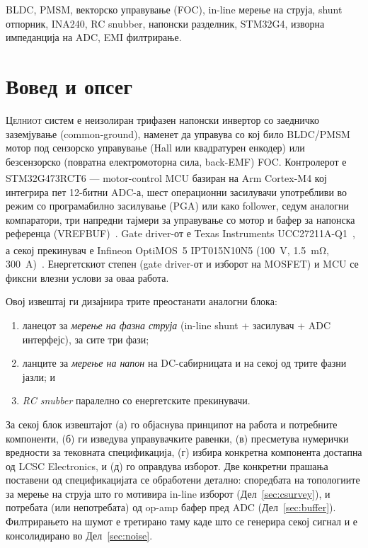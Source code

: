 \documentclass[journal,onecolumn,11pt]{IEEEtran}
\renewcommand{\IEEEPARstart}[2]{\lettrine[lines=2,findent=2pt,nindent=0pt]{#1}{#2}}
\begin{document}
\begin{IEEEkeywords}
BLDC, PMSM, векторско управување (FOC), in-line мерење на струја, shunt отпорник, INA240,
RC snubber, напонски разделник, STM32G4, изворна импеданција на ADC, EMI филтрирање.
\end{IEEEkeywords}

\section{Вовед и опсег}
\IEEEPARstart{Ц}{елниот} систем е неизолиран трифазен напонски инвертор со заедничко
заземјување (common-ground), наменет да управува со кој било BLDC/PMSM мотор под сензорско
управување (Hall или квадратурен енкодер) или безсензорско (повратна електромоторна сила,
back-EMF) FOC. Контролерот е STM32G473RCT6 --- motor-control MCU базиран на
Arm\textsuperscript{\textregistered} Cortex\textsuperscript{\textregistered}-M4 кој интегрира
пет \mbox{12-битни} ADC-а, шест операционни засилувачи употребливи во режим со програмабилно
засилување (PGA) или како follower, седум аналогни компаратори, три напредни тајмери за
управување со мотор и бафер за напонска референца (VREFBUF)~\cite{stm32g473ds}. Gate driver-от
е Texas Instruments UCC27211A-Q1~\cite{ucc27211}, а секој прекинувач е Infineon
OptiMOS\textsuperscript{\texttrademark}~5 IPT015N10N5 (\SI{100}{\volt}, \SI{1.5}{\milli\ohm},
\SI{300}{\ampere})~\cite{ipt015ds,ipt015part}. Енергетскиот степен (gate driver-от и изборот на
MOSFET) и MCU се фиксни влезни услови за оваа работа.

Овој извештај ги дизајнира трите преостанати аналогни блока:
\begin{enumerate}[leftmargin=1.4em]
  \item ланецот за \emph{мерење на фазна струја} (in-line shunt + засилувач + ADC интерфејс), за
        сите три фази;
  \item ланците за \emph{мерење на напон} на DC-сабирницата и на секој од трите фазни јазли; и
  \item \emph{RC snubber} паралелно со енергетските прекинувачи.
\end{enumerate}
За секој блок извештајот (а) го објаснува принципот на работа и потребните компоненти,
(б) ги изведува управувачките равенки, (в) пресметува нумерички вредности за тековната
спецификација, (г) избира конкретна компонента достапна од LCSC Electronics, и (д) го оправдува
изборот. Две конкретни прашања поставени од спецификацијата се обработени детално: споредбата на
топологиите за мерење на струја што го мотивира in-line изборот (Дел~\ref{sec:csurvey}), и
потребата (или непотребата) од op-amp бафер пред ADC (Дел~\ref{sec:buffer}). Филтрирањето на
шумот е третирано таму каде што се генерира секој сигнал и е консолидирано во Дел~\ref{sec:noise}.
\end{document}
